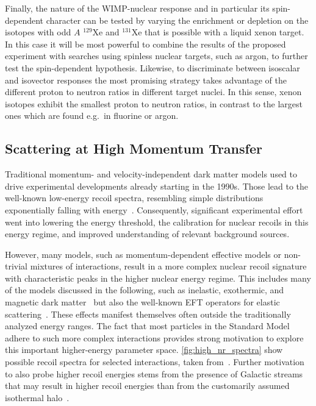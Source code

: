 Finally, the nature of the WIMP-nuclear response and in particular its spin-dependent character can be tested by varying the enrichment or depletion on the isotopes with odd $A$ $^{129}$Xe and $^{131}$Xe that is possible with a liquid xenon target. In this case it will be most powerful to combine the results of the proposed experiment with searches using spinless nuclear targets, such as argon, to further test the spin-dependent hypothesis. Likewise, to discriminate between isoscalar and isovector responses the most promising strategy takes advantage of the different proton to neutron ratios in different target nuclei. In this sense, xenon isotopes exhibit the smallest proton to neutron ratios, in contrast to the largest ones which are found e.g.~in fluorine or argon.

\subsection{Scattering at High Momentum Transfer}

Traditional momentum- and velocity-independent dark matter models used to drive experimental developments already starting in the 1990s. Those lead to the well-known low-energy recoil spectra, resembling simple distributions exponentially falling with energy~\cite{Lewin:1995rx}. Consequently, significant experimental effort went into lowering the energy threshold, the calibration for nuclear recoils in this energy regime, and improved understanding of relevant background sources. 

However, many models, such as momentum-dependent effective models or non-trivial mixtures of interactions, result in a more complex nuclear recoil signature with characteristic peaks in the higher nuclear energy regime. This includes many of the models discussed in the following, such as inelastic, exothermic, and magnetic dark matter~\cite{Schneck:2015eqa,TuckerSmith:2001hy, Graham:2010ca, Dienes:2014via, Bramante:2016rdh} but also the well-known EFT operators for elastic scattering~\cite{Gluscevic:2015sqa, Aprile:2017aas,Gelmini:2018ogy}. These effects manifest themselves often outside the traditionally analyzed energy ranges. The fact that most particles in the Standard Model adhere to such more complex interactions provides strong motivation to explore this important higher-energy parameter space. \autoref{fig:high_nr_spectra} show possible recoil spectra for selected interactions, taken from~\cite{Bozorgnia:2018jep}. Further motivation to also probe higher recoil energies stems from the presence of Galactic streams that may result in higher recoil energies than from the customarily assumed isothermal halo~\cite{Freese:2003tt,Helmi:2004id,Vogelsberger:2007ny,Kuhlen:2009vh,Lang:2010cd,Purcell:2012sh,Buckley:2019skk}. 

